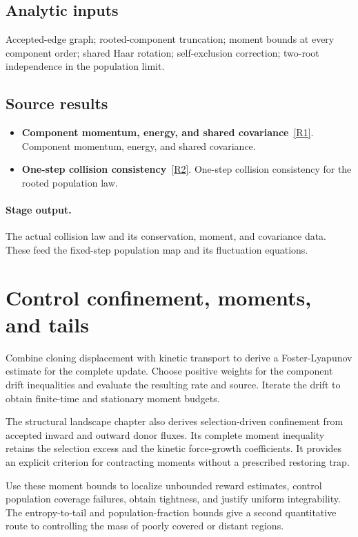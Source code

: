 \documentclass[11pt,a4paper]{article}
\begin{document}
\subsection*{Analytic inputs}
Accepted-edge graph; rooted-component truncation; moment bounds at every component order; shared Haar rotation; self-exclusion correction; two-root independence in the population limit.
\subsection*{Source results}
\begin{itemize}
\item \textbf{Component momentum, energy, and shared covariance}~\hyperref[src:thm-mean-field-component-identities]{[R1]}. Component momentum, energy, and shared covariance.
\item \textbf{One-step collision consistency}~\hyperref[src:thm-mean-field-one-step-consistency]{[R2]}. One-step collision consistency for the rooted population law.
\end{itemize}
\paragraph{Stage output.} The actual collision law and its conservation, moment, and covariance data. These feed the fixed-step population map and its fluctuation equations.

\section{Control confinement, moments, and tails}
\label{stage:3}
Combine cloning displacement with kinetic transport to derive a Foster-Lyapunov estimate for the complete update. Choose positive weights for the component drift inequalities and evaluate the resulting rate and source. Iterate the drift to obtain finite-time and stationary moment budgets.

The structural landscape chapter also derives selection-driven confinement from accepted inward and outward donor fluxes. Its complete moment inequality retains the selection excess and the kinetic force-growth coefficients. It provides an explicit criterion for contracting moments without a prescribed restoring trap.

Use these moment bounds to localize unbounded reward estimates, control population coverage failures, obtain tightness, and justify uniform integrability. The entropy-to-tail and population-fraction bounds give a second quantitative route to controlling the mass of poorly covered or distant regions.
\end{document}
